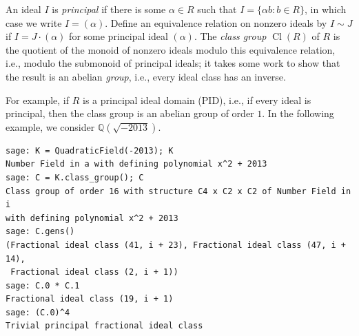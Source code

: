 \documentclass{book}
\theoremstyle{plain}
\theoremstyle{definition}
\numberwithin{equation}{section}
\numberwithin{figure}{section}
\numberwithin{table}{section}
\DeclareMathOperator{\Cl}{Cl}
\newcommand{\Q}{\mathbb{Q}}
\begin{document}
An ideal $I$ is {\em principal} if there is some $\alpha \in R$ such
that $I = \{\alpha b : b \in R\}$, in which case we write $I=(\alpha)$.
Define an equivalence relation on nonzero ideals by
$I\sim J$ if $I=J\cdot (\alpha)$ for some principal ideal
$(\alpha)$.
The {\em class group} $\Cl(R)$ of $R$ is the quotient of the monoid of
nonzero ideals modulo this equivalence relation, i.e., modulo the
submonoid of principal ideals; it takes some work to show that
the result is an abelian {\em group}, i.e., every ideal class
has an inverse.

For example, if $R$ is a principal ideal domain (PID), i.e., if
every ideal is principal, then the class group is an abelian group
of order $1$.   In the following example, we consider $\Q(\sqrt{-2013})$.

\begin{lstlisting}
sage: K = QuadraticField(-2013); K
Number Field in a with defining polynomial x^2 + 2013
sage: C = K.class_group(); C
Class group of order 16 with structure C4 x C2 x C2 of Number Field in i
with defining polynomial x^2 + 2013
sage: C.gens()
(Fractional ideal class (41, i + 23), Fractional ideal class (47, i + 14),
 Fractional ideal class (2, i + 1))
sage: C.0 * C.1
Fractional ideal class (19, i + 1)
sage: (C.0)^4
Trivial principal fractional ideal class
\end{lstlisting}
\end{document}
